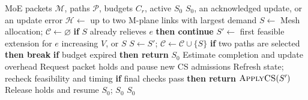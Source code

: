 \begin{algorithm}[H]
  \caption{CS configuration for at most two hotspots}
  \label{alg:noc-configuration}
  \small
  \begin{algorithmic}[1]
    \Require MoE packets $\mathcal M$, paths $\mathcal P$, budgets $C_r$, active $S_0$
    \Ensure $S_0$, an acknowledged update, or an update error
    \State $\mathcal H\gets$ up to two M-plane links with largest demand
    \State $S\gets$ Mesh allocation; $\mathcal C\gets\varnothing$
      \State \textbf{if} $S$ already relieves $e$ \textbf{then continue}
      \State $S'\gets$ first feasible extension for $e$ increasing $V$, or $S$
        \State $S\gets S'$; $\mathcal C\gets\mathcal C\cup\{S\}$
      \EndIf
      \State \textbf{if} two paths are selected \textbf{then break}
    \EndFor
      \State \textbf{if} budget expired \textbf{then return} $S_0$
      \State Estimate completion and update overhead
        \State Request packet holds and pause new CS admissions
          \State Refresh state; recheck feasibility and timing
          \State \textbf{if} final checks pass \textbf{then return} $\Call{ApplyCS}{S'}$
        \EndIf
        \State Release holds and resume $S_0$; \Return $S_0$
      \EndIf
    \EndFor
    \State \Return $S_0$
  \end{algorithmic}
\end{algorithm}
